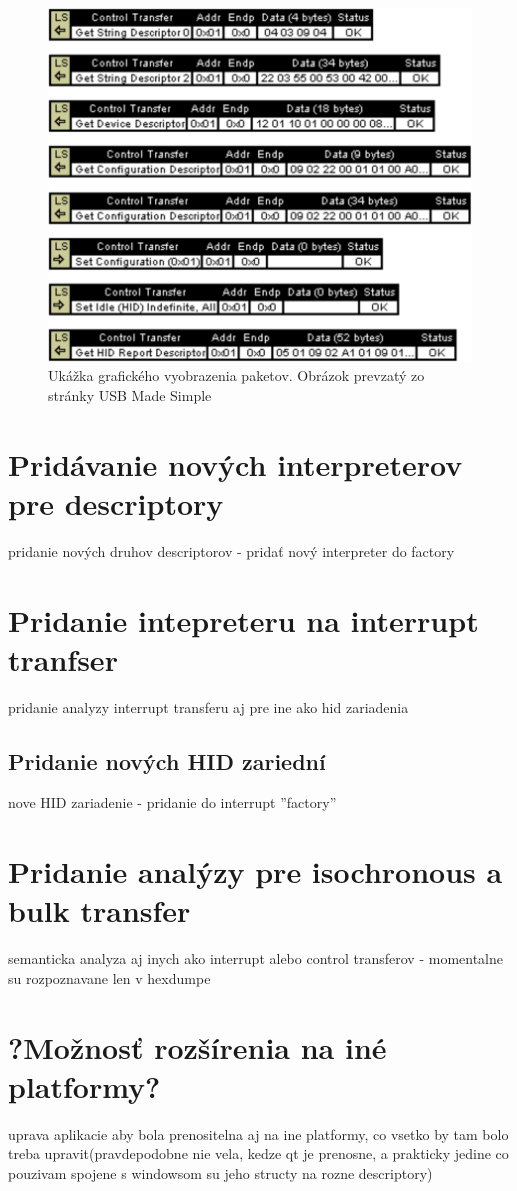 \begin{figure}[!htb]
	\centering
	\includegraphics[width=12cm]{img/kap05_graphics_packets}
	\caption{Ukážka grafického vyobrazenia paketov. Obrázok prevzatý zo stránky USB Made Simple~\cite{usbmadesimple_graphics}}
	\label{obr:kap5:graphics_packets}
\end{figure}

\newpage
\section{Pridávanie nových interpreterov pre descriptory}
pridanie nových druhov descriptorov - pridať nový interpreter do factory
\section{Pridanie intepreteru na interrupt tranfser}
pridanie analyzy interrupt transferu aj pre ine ako hid zariadenia
\subsection{Pridanie nových HID zariední}
nove HID zariadenie - pridanie do interrupt ''factory''
\section{Pridanie analýzy pre isochronous a bulk transfer}
semanticka analyza aj inych ako interrupt alebo control transferov - momentalne su rozpoznavane len v hexdumpe
\section{?Možnosť rozšírenia na iné platformy?}
uprava aplikacie aby bola prenositelna aj na ine platformy, co vsetko by tam bolo treba upravit(pravdepodobne nie vela, kedze qt je prenosne, a prakticky jedine co pouzivam spojene s windowsom su jeho structy na rozne descriptory)
